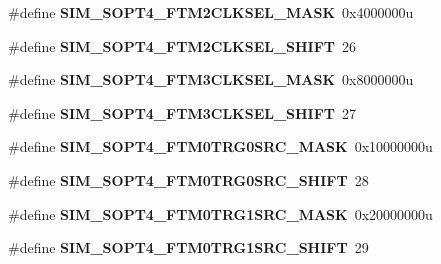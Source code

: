 \begin{DoxyCompactItemize}
\item 
\hypertarget{group___s_i_m___register___masks_ga8e9ace9af53ead470265ca2338402dae}{}\#define {\bfseries S\+I\+M\+\_\+\+S\+O\+P\+T4\+\_\+\+F\+T\+M2\+C\+L\+K\+S\+E\+L\+\_\+\+M\+A\+S\+K}~0x4000000u\label{group___s_i_m___register___masks_ga8e9ace9af53ead470265ca2338402dae}

\item 
\hypertarget{group___s_i_m___register___masks_ga4b5b8e4dc00734623d8a16db8ff0510c}{}\#define {\bfseries S\+I\+M\+\_\+\+S\+O\+P\+T4\+\_\+\+F\+T\+M2\+C\+L\+K\+S\+E\+L\+\_\+\+S\+H\+I\+F\+T}~26\label{group___s_i_m___register___masks_ga4b5b8e4dc00734623d8a16db8ff0510c}

\item 
\hypertarget{group___s_i_m___register___masks_gad4d365b5afa43ac25661ec0d06423162}{}\#define {\bfseries S\+I\+M\+\_\+\+S\+O\+P\+T4\+\_\+\+F\+T\+M3\+C\+L\+K\+S\+E\+L\+\_\+\+M\+A\+S\+K}~0x8000000u\label{group___s_i_m___register___masks_gad4d365b5afa43ac25661ec0d06423162}

\item 
\hypertarget{group___s_i_m___register___masks_ga54a0762662b5e94c962af29aa373c893}{}\#define {\bfseries S\+I\+M\+\_\+\+S\+O\+P\+T4\+\_\+\+F\+T\+M3\+C\+L\+K\+S\+E\+L\+\_\+\+S\+H\+I\+F\+T}~27\label{group___s_i_m___register___masks_ga54a0762662b5e94c962af29aa373c893}

\item 
\hypertarget{group___s_i_m___register___masks_ga14159dfb09e3ad4c1b9f2f4950a3f4a6}{}\#define {\bfseries S\+I\+M\+\_\+\+S\+O\+P\+T4\+\_\+\+F\+T\+M0\+T\+R\+G0\+S\+R\+C\+\_\+\+M\+A\+S\+K}~0x10000000u\label{group___s_i_m___register___masks_ga14159dfb09e3ad4c1b9f2f4950a3f4a6}

\item 
\hypertarget{group___s_i_m___register___masks_ga76c7302a8f939758f0b68fb05ea6dd08}{}\#define {\bfseries S\+I\+M\+\_\+\+S\+O\+P\+T4\+\_\+\+F\+T\+M0\+T\+R\+G0\+S\+R\+C\+\_\+\+S\+H\+I\+F\+T}~28\label{group___s_i_m___register___masks_ga76c7302a8f939758f0b68fb05ea6dd08}

\item 
\hypertarget{group___s_i_m___register___masks_ga427b99978dda3f6bf1c0a97559315276}{}\#define {\bfseries S\+I\+M\+\_\+\+S\+O\+P\+T4\+\_\+\+F\+T\+M0\+T\+R\+G1\+S\+R\+C\+\_\+\+M\+A\+S\+K}~0x20000000u\label{group___s_i_m___register___masks_ga427b99978dda3f6bf1c0a97559315276}

\item 
\hypertarget{group___s_i_m___register___masks_gacf67b2d7908669c38dfb06eff3c7fa8a}{}\#define {\bfseries S\+I\+M\+\_\+\+S\+O\+P\+T4\+\_\+\+F\+T\+M0\+T\+R\+G1\+S\+R\+C\+\_\+\+S\+H\+I\+F\+T}~29\label{group___s_i_m___register___masks_gacf67b2d7908669c38dfb06eff3c7fa8a}


\end{DoxyCompactItemize}
